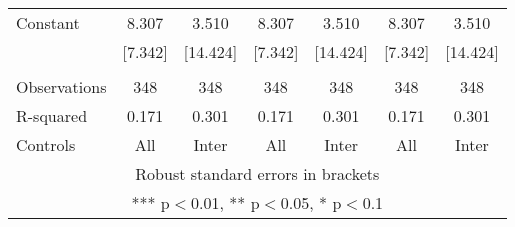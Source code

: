 \begin{tabular}{lcccccc}
Constant & 8.307 & 3.510 & 8.307 & 3.510 & 8.307 & 3.510 \\
 & [7.342] & [14.424] & [7.342] & [14.424] & [7.342] & [14.424] \\
 &  &  &  &  &  &  \\
Observations & 348 & 348 & 348 & 348 & 348 & 348 \\
R-squared & 0.171 & 0.301 & 0.171 & 0.301 & 0.171 & 0.301 \\
 Controls & All & Inter & All & Inter & All & Inter \\ \hline
\multicolumn{7}{c}{ Robust standard errors in brackets} \\
\multicolumn{7}{c}{ *** p$<$0.01, ** p$<$0.05, * p$<$0.1} \\
\end{tabular}
